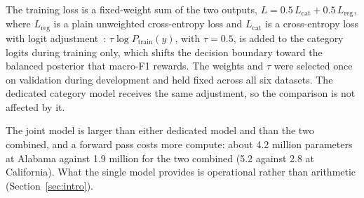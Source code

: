 The training loss is a fixed-weight sum of the two outputs, $L = 0.5\,L_{\mathrm{cat}} + 0.5\,L_{\mathrm{reg}}$, where $L_{\mathrm{reg}}$ is a plain unweighted cross-entropy loss and $L_{\mathrm{cat}}$ is a
cross-entropy loss with logit adjustment~\cite{menon2021logitadjustment}: $\tau\log P_{\mathrm{train}}(y)$, with $\tau=0.5$, is added
to the category logits during training only, which shifts the decision boundary toward the balanced
posterior that macro-F1 rewards.
The weights and $\tau$ were selected once on validation during development and held fixed across all
six datasets. The dedicated category model receives the same adjustment, so the comparison is not affected
by it.

The joint model is larger than either dedicated model and than the two combined, and a forward pass
costs more compute: about 4.2 million parameters at Alabama against 1.9 million for the two combined
(5.2 against 2.8 at California). What the single model provides is operational rather than arithmetic
(Section~\ref{sec:intro}).

